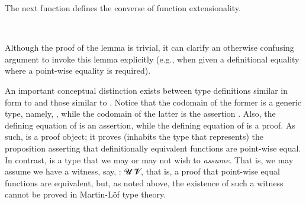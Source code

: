 \documentclass[a4paper,UKenglish,cleveref,autoref,thm-restate,11pt]{lipics-v2021}
\begin{document}
The next function defines the converse of function extensionality.
\ccpad
\begin{code}%
\>[0]\AgdaSpace{}%
\AgdaSymbol{:}\AgdaSpace{}%
\AgdaSymbol{\{}\AgdaSpace{}%
\AgdaSymbol{:}\AgdaSpace{}%
\AgdaSpace{}%
\AgdaSpace{}%
\AgdaSymbol{\}}\AgdaSpace{}%
\AgdaSymbol{\{}\AgdaSpace{}%
\AgdaSymbol{:}\AgdaSpace{}%
\AgdaSpace{}%
\AgdaSpace{}%
\AgdaSpace{}%
\AgdaSpace{}%
\AgdaSymbol{\}}\AgdaSpace{}%
\AgdaSymbol{\{}\AgdaSpace{}%
\AgdaSpace{}%
\AgdaSymbol{:}\AgdaSpace{}%
\AgdaSpace{}%
\AgdaSymbol{\}}\AgdaSpace{}%
\AgdaSpace{}%
\AgdaSpace{}%
\AgdaSpace{}%
\AgdaSpace{}%
\AgdaSpace{}%
\AgdaSpace{}%
\AgdaSpace{}%
\<%
\\
%
\>[0]\AgdaSpace{}%
\AgdaSpace{}%
\AgdaSymbol{\AgdaUnderscore{}}\AgdaSpace{}%
\AgdaSymbol{=}\AgdaSpace{}%
\<%
\end{code}
\ccpad
Although the proof of the  lemma is trivial, it can clarify an otherwise confusing argument to invoke this lemma explicitly (e.g., when given a definitional equality where a point-wise equality is required).

An important conceptual distinction exists between type definitions similar in form to  and those similar to .  Notice that the codomain of the former is a generic type, namely,
\AgdaSymbol{(}\AgdaSpace{}%
\AgdaSpace{}%
\AgdaSymbol{)}%
, while the codomain of the latter is the assertion
\AgdaSpace{}%
\AgdaSpace{}%
.  Also, the defining equation of  is an assertion, while the defining equation of  is a proof.  As such,  is a proof object; it proves (inhabits the type that represents) the proposition asserting that definitionally equivalent functions are point-wise equal. In contrast,  is a type that we may or may not wish to \emph{assume}.  That is, we may assume we have a witness, say,  \as :  \ab 𝓤 \ab 𝓥, that is, a proof that point-wise equal functions are equivalent, but, as noted above, the existence of such a witness cannot be proved in Martin-L\"of type theory.
\end{document}
